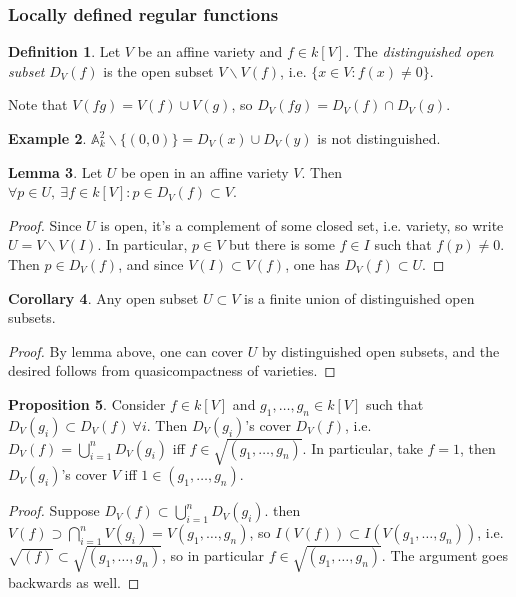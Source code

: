 \documentclass{article}
\newcommand{\A}{\mathbb{A}}
\theoremstyle{definition}
\newtheorem{defn}{Definition}[subsection]
\newtheorem{prop}[defn]{Proposition}
\newtheorem{lemma}[defn]{Lemma}
\newtheorem{coro}[defn]{Corollary}
\newtheorem{example}[defn]{Example}
\begin{document}
\subsubsection{Locally defined regular functions}
\begin{defn}
Let $V$ be an affine variety and $f\in k[V]$. The \textit{distinguished open subset} $D_V(f)$ is the open subset $V\backslash V(f)$, i.e. $\{x\in V:f(x)\neq 0\}$.
\end{defn}

Note that $V(fg)=V(f)\cup V(g)$, so $D_V(fg)=D_V(f)\cap D_V(g)$.

\begin{example}
$\A_k^2\backslash\{(0,0)\}=D_V(x)\cup D_V(y)$ is not distinguished.
\end{example}

\begin{lemma}
Let $U$ be open in an affine variety $V$. Then $\forall p\in U,\ \exists f\in k[V]:p\in D_V(f)\subset V$.
\end{lemma}
\begin{proof}
Since $U$ is open, it's a complement of some closed set, i.e. variety, so write $U=V\backslash V(I)$. In particular, $p\in V$ but there is some $f\in I$ such that $f(p)\neq 0$. Then $p\in D_V(f)$, and since $V(I)\subset V(f)$, one has $D_V(f)\subset U$.
\end{proof}
\begin{coro}
\label{coro:openisunionofdos}
Any open subset $U\subset V$ is a finite union of distinguished open subsets.
\end{coro}
\begin{proof}
By lemma above, one can cover $U$ by distinguished open subsets, and the desired follows from quasicompactness of varieties.
\end{proof}

\begin{prop}
\label{prop:doscoveriffinrad}
Consider $f\in k[V]$ and $g_1,\ldots,g_n\in k[V]$ such that $D_V(g_i)\subset D_V(f) \ \forall i$. Then $D_V(g_i)$'s cover $D_V(f)$, i.e. $D_V(f)=\bigcup_{i=1}^n D_V(g_i)$ iff $f\in\sqrt{(g_1,\ldots,g_n)}$. In particular, take $f=1$, then $D_V(g_i)$'s cover $V$ iff $1\in (g_1,\ldots,g_n)$.
\end{prop}
\begin{proof}
Suppose $D_V(f)\subset\bigcup_{i=1}^nD_V(g_i)$. then $V(f)\supset\bigcap_{i=1}^n V(g_i)=V(g_1,\ldots,g_n)$, so $I(V(f))\subset I(V(g_1,\ldots,g_n))$, i.e. $\sqrt{(f)}\subset\sqrt{(g_1,\ldots,g_n)}$, so in particular $f\in\sqrt{(g_1,\ldots,g_n)}$. The argument goes backwards as well.
\end{proof}
\end{document}
